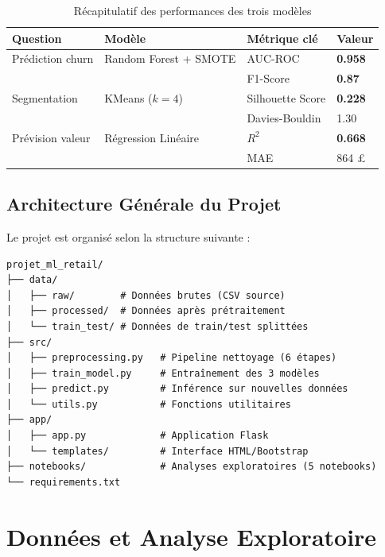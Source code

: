 \documentclass[12pt,a4paper]{article}
\begin{document}
\begin{table}[H]
\centering
\caption{Récapitulatif des performances des trois modèles}
\begin{tabular}{llll}
\toprule
\textbf{Question} & \textbf{Modèle} & \textbf{Métrique clé} & \textbf{Valeur} \\
\midrule
Prédiction churn & Random Forest + SMOTE & AUC-ROC & \textbf{0.958} \\
                 &                        & F1-Score & \textbf{0.87} \\
\midrule
Segmentation     & KMeans ($k=4$)         & Silhouette Score & \textbf{0.228} \\
                 &                        & Davies-Bouldin   & 1.30 \\
\midrule
Prévision valeur & Régression Linéaire    & $R^2$ & \textbf{0.668} \\
                 &                        & MAE   & 864 £ \\
\bottomrule
\end{tabular}
\end{table}

\subsection{Architecture Générale du Projet}

Le projet est organisé selon la structure suivante :

\begin{mdframed}[backgroundcolor=lightgray, linecolor=primary, linewidth=1pt]
\begin{verbatim}
projet_ml_retail/
├── data/
│   ├── raw/        # Données brutes (CSV source)
│   ├── processed/  # Données après prétraitement
│   └── train_test/ # Données de train/test splittées
├── src/
│   ├── preprocessing.py   # Pipeline nettoyage (6 étapes)
│   ├── train_model.py     # Entraînement des 3 modèles
│   ├── predict.py         # Inférence sur nouvelles données
│   └── utils.py           # Fonctions utilitaires
├── app/
│   ├── app.py             # Application Flask
│   └── templates/         # Interface HTML/Bootstrap
├── notebooks/             # Analyses exploratoires (5 notebooks)
└── requirements.txt
\end{verbatim}
\end{mdframed}

\section{Données et Analyse Exploratoire}
\end{document}

